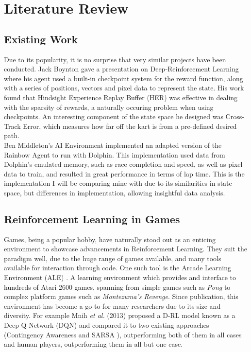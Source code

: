\chapter{Literature Review}
\section{Existing Work}
Due to its popularity, it is no surprise that very similar projects have been conducted. Jack Boynton gave a presentation on Deep-Reinforcement Learning \cite{JackWBoynton} where his agent used a built-in checkpoint system for the reward function, along with a series of positions, vectors and pixel data to represent the state. His work found that Hindsight Experience Replay Buffer (HER) \cite{andrychowicz2017hindsight} was effective in dealing with the sparsity of rewards, a naturally occuring problem when using checkpoints. An interesting component of the state space he designed was Cross-Track Error, which measures how far off the kart is from a pre-defined desired path. \\Ben Middleton's AI Environment \cite{BenJMiddleton} implemented an adapted version of the Rainbow Agent \cite{RainbowAgent} \cite{hessel2018rainbow} to run with Dolphin. This implementation used data from Dolphin's emulated memory, such as race completion and speed, as well as pixel data to train, and resulted in great performance in terms of lap time. This is the implementation I will be comparing mine with due to its similarities in state space, but differences in implementation, allowing insightful data analysis. 
\section{Reinforcement Learning in Games}
Games, being a popular hobby, have naturally stood out as an enticing environment to showcase advancements in Reinforcement Learning. They suit the paradigm well, due to the huge range of games available, and many tools available for interaction through code. One such tool is the Arcade Learning Environment (ALE) \cite{bellemare2013arcade}. A learning environment which provides and interface to hundreds of Atari 2600 games, spanning from simple games such as \textit{Pong} to complex platform games such as \textit{Montezuma's Revenge}. Since publication, this environment has become a go-to for many researchers due to its size and diversity. For example Mnih \textit{et al.} (2013) \cite{mnih2013playing} proposed a D-RL model known as a Deep Q Network (DQN) and compared it to two existing approaches (Contingency Awareness \cite{bellemare2012investigating} and SARSA \cite{rummery1994line}), outperforming both of them in all cases and human players, outperforming them in all but one case. 
